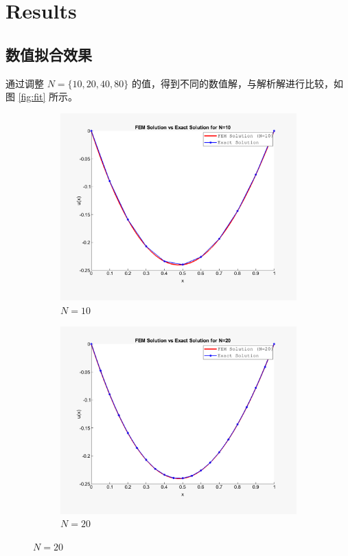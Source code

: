 \documentclass[11pt]{ctexart}
\begin{document}
\section{Results}

\subsection{数值拟合效果}
通过调整 $N=\{10,20,40,80\}$ 的值，得到不同的数值解，与解析解进行比较，如图 \ref{fig:fit} 所示。

\begin{figure}[h]
    \centering
    \begin{subfigure}{0.4\textwidth}
        \centering
        \includegraphics[width=\linewidth]{10.png}
        \caption{$ N=10 $ }
        \label{fig:sub1}
    \end{subfigure}
    \begin{subfigure}{0.4\textwidth}
        \centering
        \includegraphics[width=\linewidth]{20.png}
        \caption{$ N=20 $ }
        \label{fig:sub2}
    \end{subfigure}
    

\end{figure}
\end{document}
